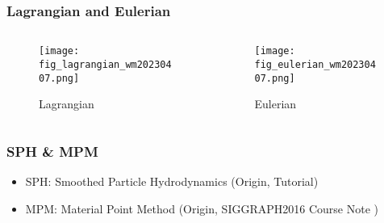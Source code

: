 \begin{frame}
    \frametitle{Lagrangian and Eulerian }
    \begin{columns}[c] %
        \begin{column}{0.48\textwidth} %
            \begin{figure}
                \texttt{[image: fig\_lagrangian\_wm20230407.png]}
                \caption{Lagrangian}
            \end{figure}
        \end{column}
        \begin{column}{0.48\textwidth} %
            \begin{figure}
                \texttt{[image: fig\_eulerian\_wm20230407.png]}
                \caption{Eulerian}
            \end{figure}
        \end{column}
    \end{columns}
\end{frame}

\begin{frame}
    \frametitle{SPH \& MPM}
    \begin{itemize}
        \item SPH: Smoothed Particle Hydrodynamics (Origin\cite{priceSmoothedParticleHydrodynamics2012}, Tutorial\cite{koschierSmoothedParticleHydrodynamics2020})
        \item MPM: Material Point Method (Origin\cite{stomakhinMaterialPointMethod2013}, SIGGRAPH2016 Course Note \cite{jiangMaterialPointMethod2016})
    \end{itemize}
\end{frame}
